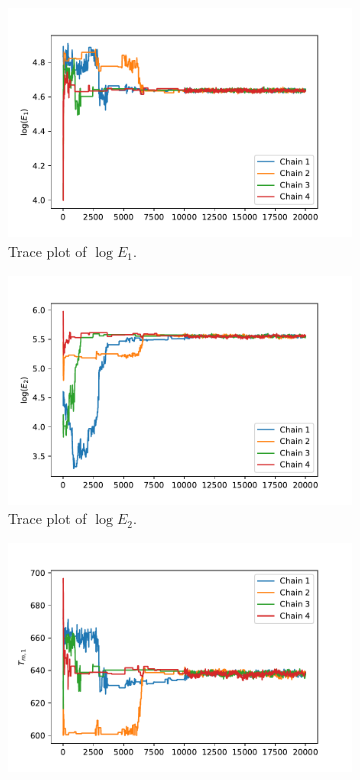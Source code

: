 \begin{figure}[h!]
\centering
\begin{subfigure}{.5\textwidth}
  \centering
  \includegraphics[width=\linewidth]{figures/bayesian/EXP_Q/trace_plot_E1.pdf}  \caption{Trace plot of $\log E_1$.}
  \label{fig:subtpE1}
\end{subfigure}%
\begin{subfigure}{.5\textwidth}
  \centering
  \includegraphics[width=\linewidth]{figures/bayesian/EXP_Q/trace_plot_E2.pdf}
  \caption{Trace plot of $\log E_2$.}
  \label{fig:subtpE2}
\end{subfigure}
\newline
\begin{subfigure}{.5\textwidth}
  \centering
  \includegraphics[width=\linewidth]{figures/bayesian/EXP_Q/trace_plot_Tm1.pdf}

\end{subfigure}
\end{figure}
